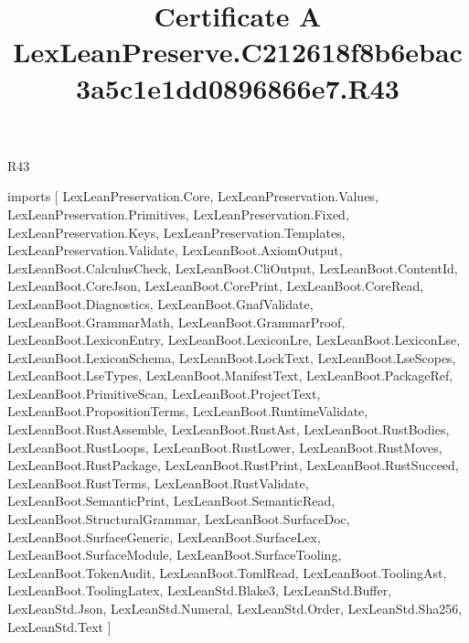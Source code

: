 \begin{lexlean}{R43}
\title{Certificate A LexLeanPreserve.C212618f8b6ebac3a5c1e1dd0896866e7.R43}
\begin{coremodule}
imports [
  LexLeanPreservation.Core,
  LexLeanPreservation.Values,
  LexLeanPreservation.Primitives,
  LexLeanPreservation.Fixed,
  LexLeanPreservation.Keys,
  LexLeanPreservation.Templates,
  LexLeanPreservation.Validate,
  LexLeanBoot.AxiomOutput,
  LexLeanBoot.CalculusCheck,
  LexLeanBoot.CliOutput,
  LexLeanBoot.ContentId,
  LexLeanBoot.CoreJson,
  LexLeanBoot.CorePrint,
  LexLeanBoot.CoreRead,
  LexLeanBoot.Diagnostics,
  LexLeanBoot.GnafValidate,
  LexLeanBoot.GrammarMath,
  LexLeanBoot.GrammarProof,
  LexLeanBoot.LexiconEntry,
  LexLeanBoot.LexiconLre,
  LexLeanBoot.LexiconLse,
  LexLeanBoot.LexiconSchema,
  LexLeanBoot.LockText,
  LexLeanBoot.LseScopes,
  LexLeanBoot.LseTypes,
  LexLeanBoot.ManifestText,
  LexLeanBoot.PackageRef,
  LexLeanBoot.PrimitiveScan,
  LexLeanBoot.ProjectText,
  LexLeanBoot.PropositionTerms,
  LexLeanBoot.RuntimeValidate,
  LexLeanBoot.RustAssemble,
  LexLeanBoot.RustAst,
  LexLeanBoot.RustBodies,
  LexLeanBoot.RustLoops,
  LexLeanBoot.RustLower,
  LexLeanBoot.RustMoves,
  LexLeanBoot.RustPackage,
  LexLeanBoot.RustPrint,
  LexLeanBoot.RustSucceed,
  LexLeanBoot.RustTerms,
  LexLeanBoot.RustValidate,
  LexLeanBoot.SemanticPrint,
  LexLeanBoot.SemanticRead,
  LexLeanBoot.StructuralGrammar,
  LexLeanBoot.SurfaceDoc,
  LexLeanBoot.SurfaceGeneric,
  LexLeanBoot.SurfaceLex,
  LexLeanBoot.SurfaceModule,
  LexLeanBoot.SurfaceTooling,
  LexLeanBoot.TokenAudit,
  LexLeanBoot.TomlRead,
  LexLeanBoot.ToolingAst,
  LexLeanBoot.ToolingLatex,
  LexLeanStd.Blake3,
  LexLeanStd.Buffer,
  LexLeanStd.Json,
  LexLeanStd.Numeral,
  LexLeanStd.Order,
  LexLeanStd.Sha256,
  LexLeanStd.Text
]


\end{coremodule}
\end{lexlean}
